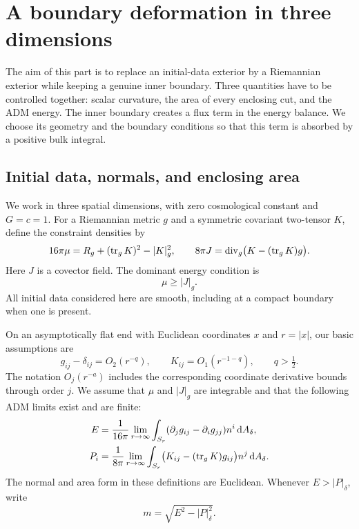 \section{A boundary deformation in three dimensions}\label{n3:intro:section}

The aim of this part is to replace an initial-data exterior by a
Riemannian exterior while keeping a genuine inner boundary. Three
quantities have to be controlled together: scalar curvature, the area
of every enclosing cut, and the ADM energy. The inner boundary creates
a flux term in the energy balance. We choose its geometry and the
boundary conditions so that this term is absorbed by a positive bulk
integral.

\subsection{Initial data, normals, and enclosing area}

We work in three spatial dimensions, with zero cosmological constant and
\(G=c=1\). For a Riemannian metric \(g\) and a symmetric covariant
two-tensor \(K\), define the constraint densities by
\begin{equation}\label{n3:intro:constraints}
 16\pi\mu=R_g+(\operatorname{tr}_gK)^2-|K|_g^2,\qquad
 8\pi J=\operatorname{div}_g\bigl(K-(\operatorname{tr}_gK)g\bigr).
\end{equation}
Here \(J\) is a covector field. The dominant energy condition is
\begin{equation}\label{n3:intro:dec}
                         \mu\ge |J|_g.
\end{equation}
All initial data considered here are smooth, including at a compact
boundary when one is present.

On an asymptotically flat end with Euclidean coordinates \(x\) and
\(r=|x|\), our basic assumptions are
\begin{equation}\label{n3:intro:decay}
 g_{ij}-\delta_{ij}=O_2(r^{-q}),\qquad
 K_{ij}=O_1(r^{-1-q}),\qquad q>\tfrac12.
\end{equation}
The notation \(O_j(r^{-a})\) includes the corresponding coordinate
derivative bounds through order \(j\). We assume that \(\mu\) and
\(|J|_g\) are integrable and that the following ADM limits exist and are
finite:
\begin{align}
 E&=\frac1{16\pi}\lim_{r\to\infty}
   \int_{S_r}(\partial_jg_{ij}-\partial_i g_{jj})n^i
                    \,\mathrm d A_\delta,\label{n3:intro:energy}\\
 P_i&=\frac1{8\pi}\lim_{r\to\infty}
   \int_{S_r}\bigl(K_{ij}-(\operatorname{tr}_gK)g_{ij}\bigr)n^j
                    \,\mathrm d A_\delta.\label{n3:intro:momentum}
\end{align}
The normal and area form in these definitions are Euclidean. Whenever
\(E>|P|_\delta\), write
\begin{equation}\label{n3:intro:rest-mass}
                         m=\sqrt{E^2-|P|_\delta^2}.
\end{equation}

